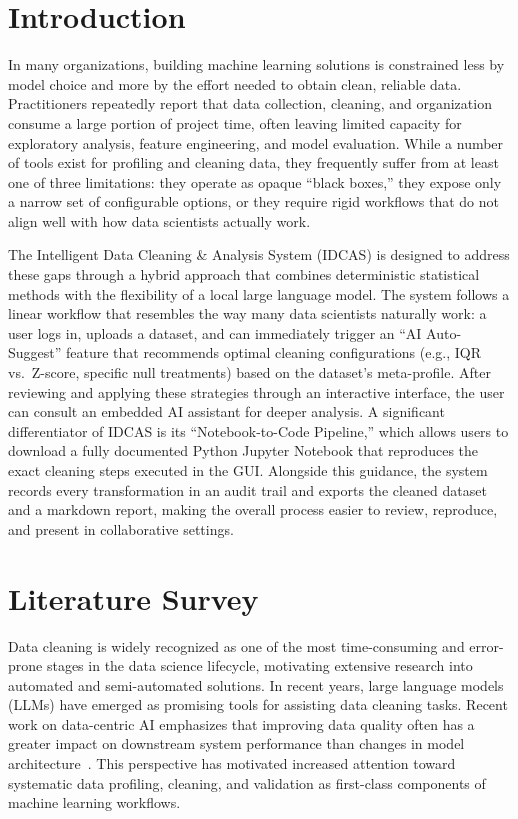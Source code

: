 \documentclass[conference]{IEEEtran}
\begin{document}
\section{Introduction}

In many organizations, building machine learning solutions is constrained less by model choice and more by the effort needed to obtain clean, reliable data. Practitioners repeatedly report that data collection, cleaning, and organization consume a large portion of project time, often leaving limited capacity for exploratory analysis, feature engineering, and model evaluation. While a number of tools exist for profiling and cleaning data, they frequently suffer from at least one of three limitations: they operate as opaque ``black boxes,'' they expose only a narrow set of configurable options, or they require rigid workflows that do not align well with how data scientists actually work.

The Intelligent Data Cleaning \& Analysis System (IDCAS) is designed to address these gaps through a hybrid approach that combines deterministic statistical methods with the flexibility of a local large language model. The system follows a linear workflow that resembles the way many data scientists naturally work: a user logs in, uploads a dataset, and can immediately trigger an ``AI Auto-Suggest'' feature that recommends optimal cleaning configurations (e.g., IQR vs.\ Z-score, specific null treatments) based on the dataset's meta-profile. After reviewing and applying these strategies through an interactive interface, the user can consult an embedded AI assistant for deeper analysis. A significant differentiator of IDCAS is its ``Notebook-to-Code Pipeline,'' which allows users to download a fully documented Python Jupyter Notebook that reproduces the exact cleaning steps executed in the GUI. Alongside this guidance, the system records every transformation in an audit trail and exports the cleaned dataset and a markdown report, making the overall process easier to review, reproduce, and present in collaborative settings.

\section{Literature Survey}

Data cleaning is widely recognized as one of the most time-consuming and error-prone stages in the data science lifecycle, motivating extensive research into automated and semi-automated solutions. In recent years, large language models (LLMs) have emerged as promising tools for assisting data cleaning tasks. Recent work on data-centric AI emphasizes that improving data quality often has a greater impact on downstream system performance than changes in model architecture~\cite{ref1}. This perspective has motivated increased attention toward systematic data profiling, cleaning, and validation as first-class components of machine learning workflows.
\end{document}
